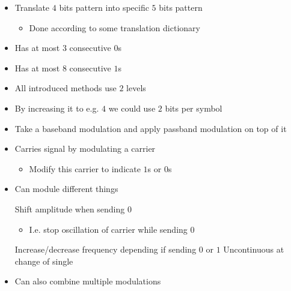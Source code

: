 \begin{itemize}
\begin{itemize}
\begin{itemize}
                \end{itemize}
                \begin{itemize}
                    \item Translate $4$ bits pattern into specific $5$ bits pattern
                        \begin{itemize}
                            \item Done according to some translation dictionary
                        \end{itemize}
                    \item Has at most $3$ consecutive $0$s
                    \item Has at most $8$ consecutive $1$s
                \end{itemize}
                \begin{itemize}
                    \item All introduced methods use $2$ levels
                    \item By increasing it to e.g. $4$ we could use $2$ bits per symbol 
                \end{itemize}
        \end{itemize}
        \begin{itemize}
            \item Take a baseband modulation and apply passband modulation on top of it 
            \item Carries signal by modulating a carrier
                \begin{itemize}
                     Some base signal oscillating at a desired frequency
                    \item Modify this carrier to indicate $1$s or $0$s
                \end{itemize}
            \item Can module different things
                \begin{itemize}
                     Shift amplitude when sending $0$
                        \begin{itemize}
                            \item I.e. stop oscillation of carrier while sending $0$
                        \end{itemize}
                     Increase/decrease frequency depending if sending $0$ or $1$
                      Uncontinuous at change of single
                \end{itemize}
            \item Can also combine multiple modulations
        \end{itemize}
\end{itemize}

